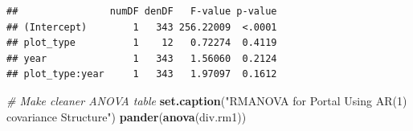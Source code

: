\documentclass[]{article}
\newenvironment{Shaded}{\begin{snugshade}}{\end{snugshade}}
\newcommand{\KeywordTok}[1]{\textcolor[rgb]{0.13,0.29,0.53}{\textbf{{#1}}}}
\newcommand{\StringTok}[1]{\textcolor[rgb]{0.31,0.60,0.02}{{#1}}}
\newcommand{\CommentTok}[1]{\textcolor[rgb]{0.56,0.35,0.01}{\textit{{#1}}}}
\newcommand{\NormalTok}[1]{{#1}}
\begin{document}
\begin{verbatim}
##                numDF denDF   F-value p-value
## (Intercept)        1   343 256.22009  <.0001
## plot_type          1    12   0.72274  0.4119
## year               1   343   1.56060  0.2124
## plot_type:year     1   343   1.97097  0.1612
\end{verbatim}

\begin{Shaded}
\begin{Highlighting}[]
\CommentTok{# Make cleaner ANOVA table}
\KeywordTok{set.caption}\NormalTok{(}\StringTok{"RMANOVA for Portal Using AR(1) covariance Structure"}\NormalTok{) }
\KeywordTok{pander}\NormalTok{(}\KeywordTok{anova}\NormalTok{(div.rm1))}
\end{Highlighting}
\end{Shaded}
\end{document}
